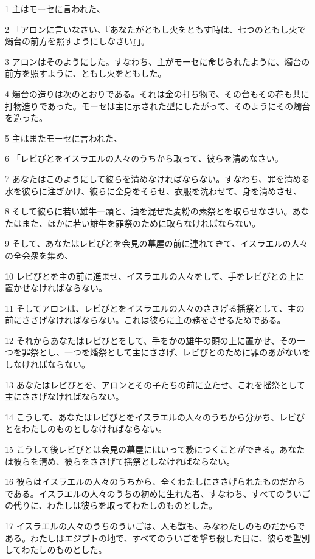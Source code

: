 \par 1 主はモーセに言われた、
\par 2 「アロンに言いなさい、『あなたがともし火をともす時は、七つのともし火で燭台の前方を照すようにしなさい』」。
\par 3 アロンはそのようにした。すなわち、主がモーセに命じられたように、燭台の前方を照すように、ともし火をともした。
\par 4 燭台の造りは次のとおりである。それは金の打ち物で、その台もその花も共に打物造りであった。モーセは主に示された型にしたがって、そのようにその燭台を造った。
\par 5 主はまたモーセに言われた、
\par 6 「レビびとをイスラエルの人々のうちから取って、彼らを清めなさい。
\par 7 あなたはこのようにして彼らを清めなければならない。すなわち、罪を清める水を彼らに注ぎかけ、彼らに全身をそらせ、衣服を洗わせて、身を清めさせ、
\par 8 そして彼らに若い雄牛一頭と、油を混ぜた麦粉の素祭とを取らせなさい。あなたはまた、ほかに若い雄牛を罪祭のために取らなければならない。
\par 9 そして、あなたはレビびとを会見の幕屋の前に連れてきて、イスラエルの人々の全会衆を集め、
\par 10 レビびとを主の前に進ませ、イスラエルの人々をして、手をレビびとの上に置かせなければならない。
\par 11 そしてアロンは、レビびとをイスラエルの人々のささげる揺祭として、主の前にささげなければならない。これは彼らに主の務をさせるためである。
\par 12 それからあなたはレビびとをして、手をかの雄牛の頭の上に置かせ、その一つを罪祭とし、一つを燔祭として主にささげ、レビびとのために罪のあがないをしなければならない。
\par 13 あなたはレビびとを、アロンとその子たちの前に立たせ、これを揺祭として主にささげなければならない。
\par 14 こうして、あなたはレビびとをイスラエルの人々のうちから分かち、レビびとをわたしのものとしなければならない。
\par 15 こうして後レビびとは会見の幕屋にはいって務につくことができる。あなたは彼らを清め、彼らをささげて揺祭としなければならない。
\par 16 彼らはイスラエルの人々のうちから、全くわたしにささげられたものだからである。イスラエルの人々のうちの初めに生れた者、すなわち、すべてのういごの代りに、わたしは彼らを取ってわたしのものとした。
\par 17 イスラエルの人々のうちのういごは、人も獣も、みなわたしのものだからである。わたしはエジプトの地で、すべてのういごを撃ち殺した日に、彼らを聖別してわたしのものとした。
